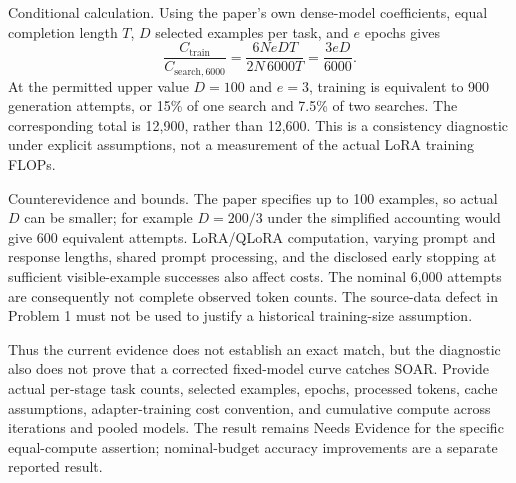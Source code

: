\documentclass[10pt]{article}
\begin{document}
Conditional calculation. Using the paper’s own dense-model coefficients, equal completion length \(T\), \(D\) selected examples per task, and \(e\) epochs gives \[\frac{C_{\mathrm{train}}}{C_{\mathrm{search},6000}}
 =\frac{6N eDT}{2N\,6000T}=\frac{3eD}{6000}.\] At the permitted upper value \(D=100\) and \(e=3\), training is equivalent to 900 generation attempts, or 15\% of one search and 7.5\% of two searches. The corresponding total is 12,900, rather than 12,600. This is a consistency diagnostic under explicit assumptions, not a measurement of the actual LoRA training FLOPs.\par
Counterevidence and bounds. The paper specifies up to 100 examples, so actual \(D\) can be smaller; for example \(D=200/3\) under the simplified accounting would give 600 equivalent attempts. LoRA/QLoRA computation, varying prompt and response lengths, shared prompt processing, and the disclosed early stopping at sufficient visible-example successes also affect costs. The nominal 6,000 attempts are consequently not complete observed token counts. The source-data defect in Problem 1 must not be used to justify a historical training-size assumption.\par
Thus the current evidence does not establish an exact match, but the diagnostic also does not prove that a corrected fixed-model curve catches SOAR. Provide actual per-stage task counts, selected examples, epochs, processed tokens, cache assumptions, adapter-training cost convention, and cumulative compute across iterations and pooled models. The result remains Needs Evidence for the specific equal-compute assertion; nominal-budget accuracy improvements are a separate reported result.\par
\end{document}
